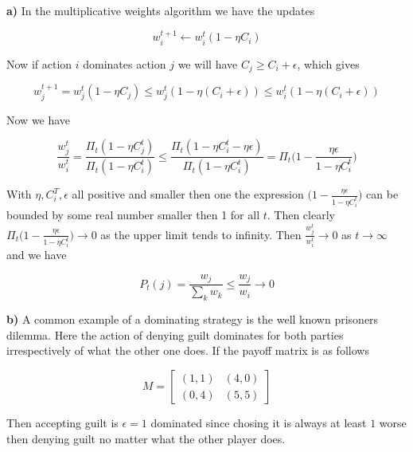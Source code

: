 \textbf{a)} In the multiplicative weights algorithm we have the updates

$$
w_i^{t+1} \leftarrow w_i^t (1- \eta C_i)
$$

Now if action $i$ dominates action $j$ we will have $C_j \ge C_i + \epsilon$, which gives

$$
w_j^{t+1} =  w_j^t (1- \eta C_j) \le w_j^t (1- \eta (C_i + \epsilon)) \le w_i^t (1- \eta (C_i + \epsilon))
$$

Now we have

$$
\frac{w_j^t}{w_i^t} = \frac{ \Pi_t (1- \eta C_j^t)}{\Pi_t (1- \eta C_i^t)} \le \frac{ \Pi_t (1- \eta C_i^t - \eta \epsilon)}{\Pi_t (1- \eta C_i^t)} = \Pi_t \bigg(1- \frac{\eta \epsilon}{1- \eta C_i^t} \bigg)
$$

With $\eta, C_i^T, \epsilon$ all positive and smaller then one the expression $\big(1- \frac{\eta \epsilon}{1- \eta C_i^t} \big)$ can be bounded by some real number smaller then 1 for all $t$. Then clearly $\Pi_t \big(1- \frac{\eta \epsilon}{1- \eta C_i^t} \big) \rightarrow 0$ as the upper limit tends to infinity. Then $\frac{w_j^t}{w_i^t} \rightarrow 0$ as $t \rightarrow \infty$ and we have

$$
P_t(j) = \frac{w_j}{\sum_k w_k} \le \frac{w_j}{w_i} \rightarrow 0
$$


\textbf{b)} A common example of a dominating strategy is the well known prisoners dilemma. Here the action of denying guilt dominates for both parties irrespectively of what the other one does. If the payoff matrix is as follows

$$
   M=
  \left[ {\begin{array}{cc}
   (1,1) & (4,0) \\ (0,4) & (5,5) \end{array} } \right]
$$

Then accepting guilt is $\epsilon=1$ dominated since chosing it is always at least $1$ worse then denying guilt no matter what the other player does.


